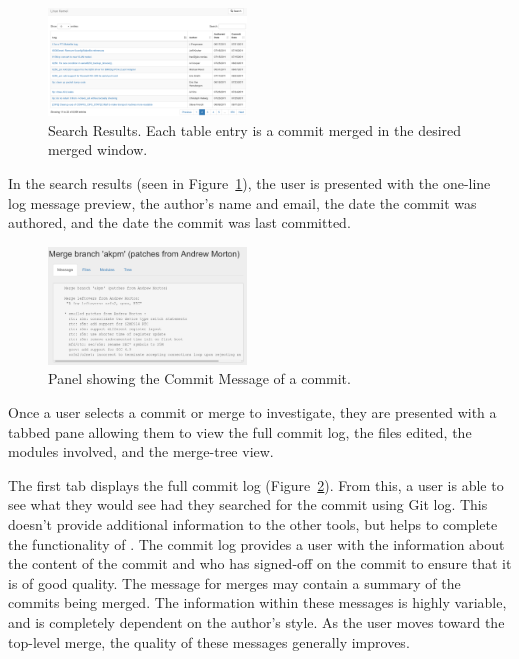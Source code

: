 \documentclass[conference, draftclsnofoot, draft]{IEEEtran}
\begin{document}
\begin{figure}
        \centering
        \includegraphics[width=0.47\textwidth]{figures/search_results_2.png}
        \caption{Search Results. Each table entry is a commit merged in the desired
                merged window.}
        \label{fig:results}
\end{figure}

In the search results (seen in Figure~\ref{fig:results}), the user is presented with the one-line log message preview,
the author's name and email, the date the commit was authored, and the date the commit was last committed.

\begin{figure}
        \centering
        \includegraphics[width=0.47\textwidth]{figures/log_view.png}
        \caption{Panel showing the Commit Message of a commit.}
        \label{fig:message}
\end{figure}

Once a user selects a commit or merge to investigate, they are presented with a
tabbed pane allowing them to view the full commit log, the files edited, the modules
involved, and the merge-tree view.

The first tab displays the full commit log (Figure~\ref{fig:message}). From this, a
user is able to see what they would see had they searched for the commit using Git
log. This doesn't provide additional information to the other tools, but helps to
complete the functionality of \tool. The commit log provides a user with the
information about the content of the commit and who has signed-off on the commit to
ensure that it is of good quality. The message for merges may contain a summary of
the commits being merged.  The information within these messages is highly variable,
and is completely dependent on the author's style. As the user moves toward the
top-level merge, the quality of these messages generally improves.
\end{document}
